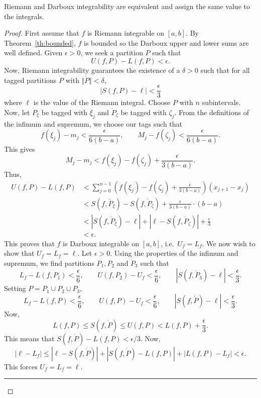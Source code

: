 \documentclass[11pt]{article}
\theoremstyle{definition}
\theoremstyle{remark}
\numberwithin{equation}{module}
\begin{document}
    \begin{theorem}
        Riemann and Darboux integrability are equivalent and assign the same value
        to the integrals. 
    \end{theorem}
    \begin{proof}
        First assume that $f$ is Riemann integrable on $[a, b]$. By
        Theorem~\ref{th:bounded}, $f$ is bounded so the Darboux upper and lower sums
        are well defined. Given $\epsilon > 0$, we seek a partition $P$ such that \[
            U(f, P) - L(f, P) < \epsilon.
        \] Now, Riemann integrability guarantees the existence of a $\delta > 0$
        such that for all tagged partitions $\dot{P}$ with $\Vert\dot{P}\Vert <
        \delta$, \[
            |S(f, P) - \ell| < \frac{\epsilon}{3}
        \] where $\ell$ is the value of the Riemann integral. Choose $P$ with $n$
        subintervals. Now, let $\dot{P}_\xi$ be tagged with $\xi_j$ and
        $\dot{P}_\zeta$ be tagged with $\zeta_j$. From the definitions of the
        infimum and supremum, we choose our tags such that \[
            f(\xi_j)  - m_j < \frac{\epsilon}{6(b - a)}, \qquad 
            M_j - f(\zeta_j) < \frac{\epsilon}{6(b - a)}.
        \] This gives \[
            M_j - m_j < f(\xi_j) - f(\zeta_j) + \frac{\epsilon}{3(b - a)}.
        \] Thus, \begin{align*}
            U(f, P) - L(f, P) &< \sum_{j = 0}^{n - 1} \left(f(\xi_j) - f(\zeta_j) +
            \frac{\epsilon}{3(b - a)}\right)(x_{j + 1} - x_{j}) \\
            &< S(f, \dot{P}_\xi) - S(f, \dot{P}_\zeta) + \frac{\epsilon}{3(b -
            a)}\cdot(b - a) \\
            &< |S(f, \dot{P}_\xi) - \ell| + |\ell - S(f, \dot{P}_\zeta)| +
            \frac{\epsilon}{3} \\
            &< \epsilon.
        \end{align*}
        This proves that $f$ is Darboux integrable on $[a, b]$, i.e.\ $U_f = L_f$.
        We now wish to show that $U_f = L_f = \ell$. Let $\epsilon > 0$. Using the
        properties of the infimum and supremum, we find partitions $P_1, P_2$ and
        $\dot{P}_3$ such that \[
            L_f - L(f, P_1) < \frac{\epsilon}{6}, \qquad
            U(f, P_2) - U_f < \frac{\epsilon}{6}, \qquad
            |S(f, \dot{P}_3) - \ell| < \frac{\epsilon}{3}.
        \] Setting $P = P_1 \cup P_2 \cup P_3$, \[
            L_f - L(f, P) < \frac{\epsilon}{6}, \qquad
            U(f, P) - U_f < \frac{\epsilon}{6}, \qquad
            |S(f, \dot{P}) - \ell| < \frac{\epsilon}{3}.
        \] Now, \[
            L(f, P) \leq S(f, \dot{P}) \leq U(f, P) < L(f, P) + \frac{\epsilon}{3}.
        \] This means that $S(f, \dot{P}) - L(f, P) < \epsilon / 3$. Now, \[
            |\ell - L_f| \leq |\ell - S(f, \dot{P})| + |S(f, \dot{P}) - L(f, P)| +
            |L(f, P) - L_f| < \epsilon.
        \] This forces $U_f = L_f = \ell$.
        \begin{center}
            \rule{5em}{0.5pt}
        \end{center}


\end{proof}
\end{document}

